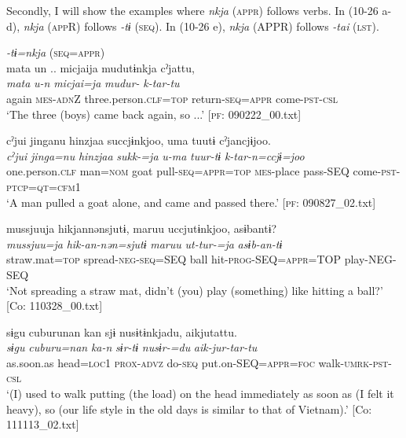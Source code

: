  Secondly, I will show the examples where \textit{nkja} (\textsc{appr}) follows verbs. In (10-26 a-d), \textit{nkja} (\textsc{app}R) follows \textit{{}-tɨ} (\textsc{seq}). In (10-26 e), \textit{nkja} (APPR) follows \textit{-tai} (\textsc{lst}).

\ea\label{ex:10.26}   
 \begin{xlist}
 \exi{} \textit{{}-tɨ=nkja} (\textsc{seq}=\textsc{appr})\\
  \ex  %
      \glll    mata  un ..  micjaija  mudutɨnkja  cˀjattu,\\
      \textit{mata}  \textit{u-n}  \textit{micjai=ja}  \textit{mudur-}  \textit{k-tar-tu}\\
      again  \textsc{mes}-\textsc{adn}Z  three.person.\textsc{clf}=\textsc{top}  return-\textsc{seq}=\textsc{appr}  come-\textsc{pst}{}-\textsc{csl}\\
      \glt       ‘The three (boys) came back again, so ...’ [\textsc{pf}: 090222\_00.txt]

  \ex  %
      \glll    cˀjui  jinganu  hinzjaa  succjɨnkjoo,  uma   tuutɨ  cˀjancjɨjoo.\\
      \textit{cˀjui}  \textit{jinga=nu}  \textit{hinzjaa}  \textit{sukk-=ja}  \textit{u-ma}  \textit{tuur-tɨ}  \textit{k-tar-n=ccjɨ=joo}\\
      one.person.\textsc{clf}  man=\textsc{nom}  goat  pull-\textsc{seq}=\textsc{appr}=\textsc{top}  \textsc{mes}-place  pass-SEQ  come-\textsc{pst}-\textsc{ptcp}=\textsc{qt}=\textsc{cfm}1\\
      \glt       ‘A man pulled a goat alone, and came and passed there.’ [\textsc{pf}: 090827\_02.txt]

  \ex  %
      \glll    mussjuuja  hikjannənsjutɨ,  maruu  uccjutɨnkjoo,   asɨbantɨ?      \\
      \textit{mussjuu=ja}  \textit{hik-an-nən=sjutɨ}  \textit{maruu}  \textit{ut-tur-=ja} \textit{asɨb-an-tɨ}\\
      straw.mat=\textsc{top}  spread-\textsc{neg}-\textsc{seq}=SEQ  ball  hit-\textsc{prog}-SEQ=\textsc{appr}=TOP  play-NEG-SEQ      \\
      \glt       ‘Not spreading a straw mat, didn’t (you) play (something) like hitting a ball?’ [Co: 110328\_00.txt]

  \ex  %
      \glll    sɨgu  cuburunan  kan  sjɨ  nusɨtɨnkjadu, aikjutattu.\\
      \textit{sɨgu}  \textit{cuburu=nan}  \textit{ka-n}  \textit{sɨr-tɨ}  \textit{nusɨr-=du}  \textit{aik-jur-tar-tu}\\
      as.soon.as  head=\textsc{loc}1  \textsc{prox}-\textsc{advz}  do-\textsc{seq}  put.on-SEQ=\textsc{appr}=\textsc{foc}   walk-\textsc{umrk}-\textsc{pst}-\textsc{csl}\\
      \glt       ‘(I) used to walk putting (the load) on the head immediately as soon as (I felt it heavy), so (our life style in the old days is similar to that of Vietnam).’ [Co: 111113\_02.txt]


\end{xlist}
